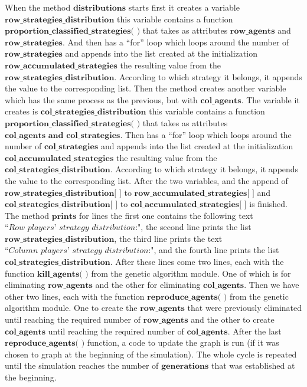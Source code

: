\documentclass{article}
\begin{document}
When the method $\textbf{distributions}$ starts first it creates a variable $\textbf{row\_strategies\_distribution}$ this variable contains a function $\textbf{proportion\_classified\_strategies( )}$ that takes as attributes $\textbf{row\_agents}$ and $\textbf{row\_strategies}$. And then has a ``for'' loop which loops around the number of  $\textbf{row\_strategies}$ and appends into the list created at the initialization $\textbf{row\_accumulated\_strategies}$ the resulting value from the $\textbf{row\_strategies\_distribution}$. According to which strategy it belongs, it appends the value to the corresponding list. 
Then the method creates another variable which has the same process as the previous, but with $\textbf{col\_agents}$. The variable it creates is $\textbf{col\_strategies\_distribution}$ this variable contains a function $\textbf{proportion\_classified\_strategies( )}$ that takes as attributes $\textbf{col\_agents and col\_strategies}$. Then has a ``for'' loop which loops around the number of  $\textbf{col\_strategies}$ and appends into the list created at the initialization $\textbf{col\_accumulated\_strategies}$ the resulting value from the $\textbf{col\_strategies\_distribution}$. According to which strategy it belongs, it appends the value to the corresponding list.
After the two variables, and the append of $\textbf{row\_strategies\_distribution[  ]}$ to $\textbf{row\_accumulated\_strategies[  ]}$ and $\textbf{col\_strategies\_distribution[  ]}$ to $\textbf{col\_accumulated\_strategies[  ]}$ is finished. The method $\textbf{prints}$ for lines the first one contains the following text $\textit{``Row players' strategy distribution:"}$, the second line prints the list $\textbf{row\_strategies\_distribution}$, the third line prints the text $\textit{``Column players' strategy distribution:"}$, and the fourth line prints the list $\textbf{col\_strategies\_distribution}$. 
After these lines come two lines, each with the function $\textbf{kill\_agents( )}$ from the genetic algorithm module. One of which is for eliminating $\textbf{row\_agents}$ and the other for eliminating $\textbf{col\_agents}$.  
Then we have other two lines, each with the function $\textbf{reproduce\_agents( )}$ from the genetic algorithm module. One to create the $\textbf{row\_agents}$ that were previously eliminated until reaching the required number of $\textbf{row\_agents}$ and the other to create $\textbf{col\_agents}$ until reaching the required number of $\textbf{col\_agents}$. 
After the last $\textbf{reproduce\_agents( )}$ function, a code to update the graph is run (if it was chosen to graph at the beginning of the simulation). 
The whole cycle is repeated until the simulation reaches the number of $\textbf{generations}$ that was established at the beginning. 
\end{document}
